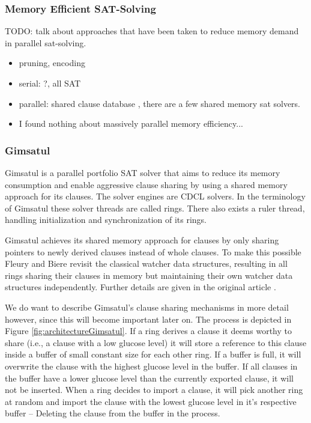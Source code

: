\documentclass[12pt,a4paper,twoside]{scrartcl}
\numberwithin{equation}{section}
\begin{document}
\subsubsection{Memory Efficient SAT-Solving}

TODO: talk about approaches that have been taken to reduce memory demand in parallel sat-solving.
\begin{itemize}
  \item pruning, encoding
  \item serial: \cite{mahajan2004zchaff2004}?, all SAT \cite{grumberg2004memory}
  \item parallel: shared clause database \cite{iser2019memory}, there are a few shared memory sat solvers.
  \item I found nothing about massively parallel memory efficiency...
\end{itemize}

\subsubsection{Gimsatul}

Gimsatul \cite{gimsatul} is a parallel portfolio SAT solver that aims to reduce its memory consumption and enable aggressive clause sharing by using a shared memory approach for its clauses. The solver engines are CDCL solvers. In the terminology of Gimsatul these solver threads are called rings. There also exists a ruler thread, handling initialization and synchronization of its rings.

Gimsatul achieves its shared memory approach for clauses by only sharing pointers to newly derived clauses instead of whole clauses. To make this possible Fleury and Biere revisit the classical watcher data structures, resulting in all rings sharing their clauses in memory but maintaining their own watcher data structures independently. Further details are given in the original article \cite{gimsatul}.

We do want to describe Gimsatul's clause sharing mechanisms in more detail however, since this will become important later on. The process is depicted in Figure \ref{fig:architectureGimsatul}. If a ring derives a clause it deems worthy to share (i.e., a clause with a low glucose level) it will store a reference to this clause inside a buffer of small constant size for each other ring. If a buffer is full, it will overwrite the clause with the highest glucose level in the buffer. If all clauses in the buffer have a lower glucose level than the currently exported clause, it will not be inserted. When a ring decides to import a clause, it will pick another ring at random and import the clause with the lowest glucose level in it's respective buffer -- Deleting the clause from the buffer in the process.
\end{document}
